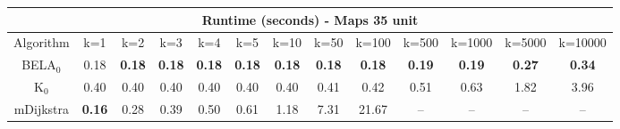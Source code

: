 \begin{tabular}{c|cccccccccccc}\toprule
\multicolumn{13}{c}{Runtime (seconds) - Maps 35 unit}\\ \midrule
Algorithm & k=1 & k=2 & k=3 & k=4 & k=5 & k=10 & k=50 & k=100 & k=500 & k=1000 & k=5000 & k=10000 \\ \midrule
BELA$_0$ & 0.18 & \textbf{0.18} & \textbf{0.18} & \textbf{0.18} & \textbf{0.18} & \textbf{0.18} & \textbf{0.18} & \textbf{0.18} & \textbf{0.19} & \textbf{0.19} & \textbf{0.27} & \textbf{0.34} \\
K$_0$ & 0.40 & 0.40 & 0.40 & 0.40 & 0.40 & 0.40 & 0.41 & 0.42 & 0.51 & 0.63 & 1.82 & 3.96 \\
mDijkstra & \textbf{0.16} & 0.28 & 0.39 & 0.50 & 0.61 & 1.18 & 7.31 & 21.67 & -- & -- & -- & -- \\ \bottomrule 
\end{tabular}

